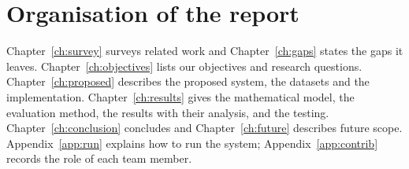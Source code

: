 \section{Organisation of the report}
Chapter~\ref{ch:survey} surveys related work and Chapter~\ref{ch:gaps} states the gaps it leaves.
Chapter~\ref{ch:objectives} lists our objectives and research questions. Chapter~\ref{ch:proposed}
describes the proposed system, the datasets and the implementation. Chapter~\ref{ch:results} gives the
mathematical model, the evaluation method, the results with their analysis, and the testing.
Chapter~\ref{ch:conclusion} concludes and Chapter~\ref{ch:future} describes future scope.
Appendix~\ref{app:run} explains how to run the system; Appendix~\ref{app:contrib} records the
role of each team member.
